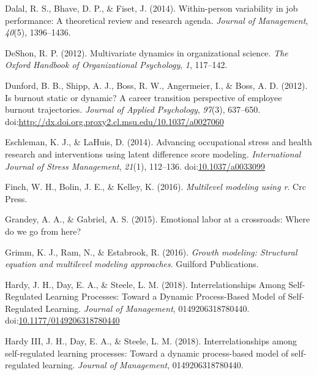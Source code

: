 \documentclass[english,,man]{apa6}
\theoremstyle{definition}
\theoremstyle{definition}
\theoremstyle{definition}
\theoremstyle{remark}
\begin{document}
\leavevmode\hypertarget{ref-dalal2014within}{}%
Dalal, R. S., Bhave, D. P., \& Fiset, J. (2014). Within-person
variability in job performance: A theoretical review and research
agenda. \emph{Journal of Management}, \emph{40}(5), 1396--1436.

\leavevmode\hypertarget{ref-deshon_multivariate_2012}{}%
DeShon, R. P. (2012). Multivariate dynamics in organizational science.
\emph{The Oxford Handbook of Organizational Psychology}, \emph{1},
117--142.

\leavevmode\hypertarget{ref-dunford_is_2012}{}%
Dunford, B. B., Shipp, A. J., Boss, R. W., Angermeier, I., \& Boss, A.
D. (2012). Is burnout static or dynamic? A career transition perspective
of employee burnout trajectories. \emph{Journal of Applied Psychology},
\emph{97}(3), 637--650.
doi:\href{https://doi.org/http://dx.doi.org.proxy2.cl.msu.edu/10.1037/a0027060}{http://dx.doi.org.proxy2.cl.msu.edu/10.1037/a0027060}

\leavevmode\hypertarget{ref-eschleman_advancing_2014}{}%
Eschleman, K. J., \& LaHuis, D. (2014). Advancing occupational stress
and health research and interventions using latent difference score
modeling. \emph{International Journal of Stress Management},
\emph{21}(1), 112--136.
doi:\href{https://doi.org/10.1037/a0033099}{10.1037/a0033099}

\leavevmode\hypertarget{ref-finch2016multilevel}{}%
Finch, W. H., Bolin, J. E., \& Kelley, K. (2016). \emph{Multilevel
modeling using r}. Crc Press.

\leavevmode\hypertarget{ref-grandey2015emotional}{}%
Grandey, A. A., \& Gabriel, A. S. (2015). Emotional labor at a
crossroads: Where do we go from here?

\leavevmode\hypertarget{ref-grimm_growth_2016}{}%
Grimm, K. J., Ram, N., \& Estabrook, R. (2016). \emph{Growth modeling:
Structural equation and multilevel modeling approaches}. Guilford
Publications.

\leavevmode\hypertarget{ref-hardy_interrelationships_2018}{}%
Hardy, J. H., Day, E. A., \& Steele, L. M. (2018). Interrelationships
Among Self-Regulated Learning Processes: Toward a Dynamic Process-Based
Model of Self-Regulated Learning. \emph{Journal of Management},
0149206318780440.
doi:\href{https://doi.org/10.1177/0149206318780440}{10.1177/0149206318780440}

\leavevmode\hypertarget{ref-hardy2018}{}%
Hardy III, J. H., Day, E. A., \& Steele, L. M. (2018).
Interrelationships among self-regulated learning processes: Toward a
dynamic process-based model of self-regulated learning. \emph{Journal of
Management}, 0149206318780440.
\end{document}
